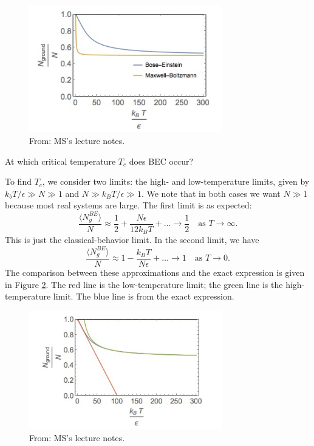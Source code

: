 \documentclass{book}
\theoremstyle{definition}
\newcommand{\f}[2]{\frac{#1}{#2}}
\begin{document}
\begin{figure}[!htb]
	\centering
	\includegraphics[width=0.75\textwidth]{images/BEC_1}
	\caption{From: MS's lecture notes.}
	\label{fig:1}
\end{figure}



\begin{framed}
	\begin{center}
		At which critical temperature $T_c$ does BEC occur?
	\end{center}
\end{framed}


To find $T_c$, we consider two limits: the high- and low-temperature limits, given by $k_bT/\epsilon \gg N \gg 1$ and $N\gg k_BT/\epsilon \gg 1$. We note that in both cases we want $N\gg 1$ because most real systems are large. The first limit is as expected:
\begin{equation*}
\f{\langle N_g^{BE}\rangle}{N} \approx \f{1}{2} + \f{N\epsilon}{12 k_B T} + \dots \to \f{1}{2} \quad \text{as } T\to \infty.
\end{equation*}
This is just the classical-behavior limit. In the second limit, we have
\begin{equation*}
\f{\langle N_g^{BE}\rangle}{N} \approx  1 - \f{k_BT}{N\epsilon} + \dots \to 1 \quad \text{as } T\to 0.
\end{equation*}
The comparison between these approximations and the exact expression is given in Figure \ref{fig:2}. The red line is the low-temperature limit; the green line is the high-temperature limit. The blue line is from the exact expression. 


\begin{figure}[!htb]
	\centering
	\includegraphics[width=0.75\textwidth]{images/BEC_2}
	\caption{From: MS's lecture notes.}
	\label{fig:2}
\end{figure}
\end{document}
